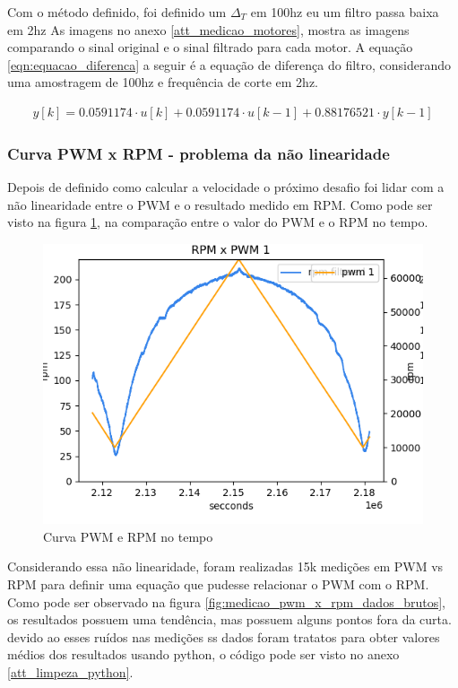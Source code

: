 Com o método definido, foi definido um $\Delta_{T}$ em 100hz eu um filtro passa baixa em 2hz
As imagens no anexo \ref{att_medicao_motores}, mostra as imagens comparando o sinal original e o sinal filtrado para cada motor.
A equação \ref{eqn:equacao_diferenca} a seguir é a equação de diferença do filtro, considerando uma amostragem de 100hz e frequência de corte em 2hz.

\begin{equation}
    \begin{split}
        y[k] = 0.0591174 \cdot u \left[ k \right] +  0.0591174 \cdot u[k - 1] + 0.88176521 \cdot y[k - 1]
    \end{split}
    \label{eqn:equacao_diferenca}
\end{equation}

\subsubsection{Curva PWM x RPM - problema da não linearidade}

Depois de definido como calcular a velocidade o próximo desafio foi lidar com a não linearidade entre o PWM e o resultado medido em RPM.
Como pode ser visto na figura \ref{fig:grafico_pwm_x_rpm}, na comparação entre o valor do PWM e o RPM no tempo.

\begin{figure}[htb]
	\centering
	\includegraphics{figures/pwm_x_rpm}
	\caption{Curva PWM e RPM no tempo}
	\label{fig:grafico_pwm_x_rpm}
\end{figure}

Considerando essa não linearidade, foram realizadas 15k medições em PWM vs RPM para definir uma equação que pudesse relacionar o PWM com o RPM.
Como pode ser observado na figura  \ref{fig:medicao_pwm_x_rpm_dados_brutos}, os resultados possuem uma tendência, mas possuem alguns pontos fora da curta.
devido ao esses ruídos nas medições ss dados foram tratatos para obter valores médios dos resultados usando python,
o código pode ser visto no anexo \ref{att_limpeza_python}.

